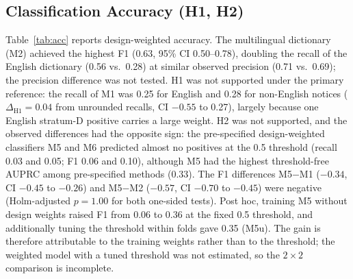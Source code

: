\documentclass[runningheads]{llncs}
\begin{document}
\subsection{Classification Accuracy (H1, H2)}
Table~\ref{tab:acc} reports design-weighted accuracy. The multilingual dictionary (M2) achieved the highest F1 (0.63, 95\% CI 0.50--0.78), doubling the recall of the English dictionary (0.56 vs.\ 0.28) at similar observed precision (0.71 vs.\ 0.69); the precision difference was not tested. H1 was not supported under the primary reference: the recall of M1 was 0.25 for English and 0.28 for non-English notices ($\Delta_{\mathrm{H1}}=0.04$ from unrounded recalls, CI $-0.55$ to 0.27), largely because one English stratum-D positive carries a large weight. H2 was not supported, and the observed differences had the opposite sign: the pre-specified design-weighted classifiers M5 and M6 predicted almost no positives at the 0.5 threshold (recall 0.03 and 0.05; F1 0.06 and 0.10), although M5 had the highest threshold-free AUPRC among pre-specified methods (0.33). The F1 differences M5$-$M1 ($-0.34$, CI $-0.45$ to $-0.26$) and M5$-$M2 ($-0.57$, CI $-0.70$ to $-0.45$) were negative (Holm-adjusted $p=1.00$ for both one-sided tests). Post hoc, training M5 without design weights raised F1 from 0.06 to 0.36 at the fixed 0.5 threshold, and additionally tuning the threshold within folds gave 0.35 (M5u). The gain is therefore attributable to the training weights rather than to the threshold; the weighted model with a tuned threshold was not estimated, so the $2\times2$ comparison is incomplete.
\end{document}

